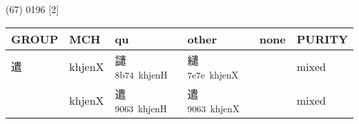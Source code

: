 \documentclass[14pt,a4paper]{scrartcl}
\begin{document}
(67) 0196 {[}2{]}

\begin{longtable}[c]{@{}llllll@{}}
\toprule
\begin{minipage}[b]{0.14\columnwidth}\raggedright\strut
GROUP
\strut\end{minipage} &
\begin{minipage}[b]{0.14\columnwidth}\raggedright\strut
MCH
\strut\end{minipage} &
\begin{minipage}[b]{0.14\columnwidth}\raggedright\strut
qu
\strut\end{minipage} &
\begin{minipage}[b]{0.14\columnwidth}\raggedright\strut
other
\strut\end{minipage} &
\begin{minipage}[b]{0.14\columnwidth}\raggedright\strut
none
\strut\end{minipage} &
\begin{minipage}[b]{0.14\columnwidth}\raggedright\strut
PURITY
\strut\end{minipage}\tabularnewline
\midrule
\endhead
\begin{minipage}[t]{0.14\columnwidth}\raggedright\strut
遣
\strut\end{minipage} &
\begin{minipage}[t]{0.14\columnwidth}\raggedright\strut
khjenX
\strut\end{minipage} &
\begin{minipage}[t]{0.14\columnwidth}\raggedright\strut
譴\textsuperscript{8b74~khjenH}
\strut\end{minipage} &
\begin{minipage}[t]{0.14\columnwidth}\raggedright\strut
繾\textsuperscript{7e7e~khjenX}
\strut\end{minipage} &
\begin{minipage}[t]{0.14\columnwidth}\raggedright\strut
\strut\end{minipage} &
\begin{minipage}[t]{0.14\columnwidth}\raggedright\strut
mixed
\strut\end{minipage}\tabularnewline
\begin{minipage}[t]{0.14\columnwidth}\raggedright\strut
𠳋
\strut\end{minipage} &
\begin{minipage}[t]{0.14\columnwidth}\raggedright\strut
khjenX
\strut\end{minipage} &
\begin{minipage}[t]{0.14\columnwidth}\raggedright\strut
遣\textsuperscript{9063~khjenH}
\strut\end{minipage} &
\begin{minipage}[t]{0.14\columnwidth}\raggedright\strut
遣\textsuperscript{9063~khjenX}
\strut\end{minipage} &
\begin{minipage}[t]{0.14\columnwidth}\raggedright\strut
\strut\end{minipage} &
\begin{minipage}[t]{0.14\columnwidth}\raggedright\strut
mixed
\strut\end{minipage}\tabularnewline
\bottomrule
\end{longtable}
\end{document}
